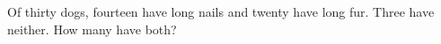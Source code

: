 Of thirty dogs, fourteen have long nails and twenty have long fur. Three have neither. How many have both?
